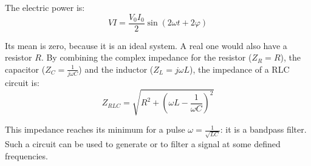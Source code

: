 \documentclass[a4paper,10pt]{article}
\begin{document}
The electric power is:
\begin{equation}
  VI = \frac{V_0 I_0}{2}\sin(2\omega t + 2\varphi)
\end{equation}

Its mean is zero, because it is an ideal system.
A real one would also have a resistor $R$.
By combining the complex impedance for the resistor ($Z_R = R$), the capacitor ($Z_C = \frac{1}{j \omega C}$) and the inductor ($Z_L = j \omega L$), the impedance of a RLC circuit is:
\begin{equation}
  Z_{RLC} = \sqrt{R^2 + \left(\omega L - \frac{1}{\omega C}\right)^2}
\end{equation}

This impedance reaches its minimum for a pulse $\omega = \frac{1}{\sqrt{LC}}$: it is a bandpass filter.
Such a circuit can be used to generate or to filter a signal at some defined frequencies.
\end{document}
